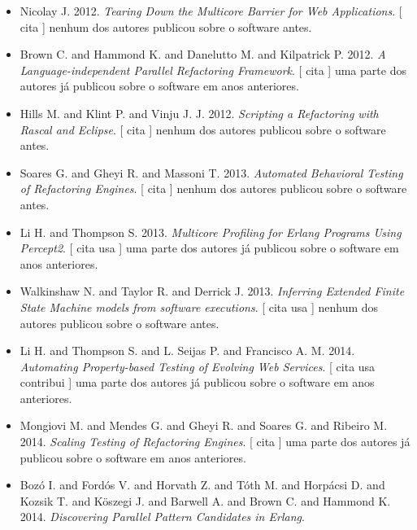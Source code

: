 \begin{itemize}
      [
          cita
          usa
          contribui
      ]
uma parte dos autores já publicou sobre o software em anos anteriores.
\item Nicolay J.
      2012.
        \textit{ Tearing Down the Multicore Barrier for Web Applications}.
      [
          cita
      ]
nenhum dos autores publicou sobre o software antes.
\item Brown C. and Hammond K. and Danelutto M. and Kilpatrick P.
      2012.
        \textit{ A Language-independent Parallel Refactoring Framework}.
      [
          cita
      ]
uma parte dos autores já publicou sobre o software em anos anteriores.
\item Hills M. and Klint P. and Vinju J. J.
      2012.
        \textit{ Scripting a Refactoring with Rascal and Eclipse}.
      [
          cita
      ]
nenhum dos autores publicou sobre o software antes.
\item Soares G. and Gheyi R. and Massoni T.
      2013.
        \textit{ Automated Behavioral Testing of Refactoring Engines}.
      [
          cita
      ]
nenhum dos autores publicou sobre o software antes.
\item Li H. and Thompson S.
      2013.
        \textit{ Multicore Profiling for Erlang Programs Using Percept2}.
      [
          cita
          usa
      ]
uma parte dos autores já publicou sobre o software em anos anteriores.
\item Walkinshaw N. and Taylor R. and Derrick J.
      2013.
        \textit{ Inferring Extended Finite State Machine models from software executions}.
      [
          cita
          usa
      ]
nenhum dos autores publicou sobre o software antes.
\item Li H. and Thompson S. and L. Seijas P. and Francisco A. M.
      2014.
        \textit{ Automating Property-based Testing of Evolving Web Services}.
      [
          cita
          usa
          contribui
      ]
uma parte dos autores já publicou sobre o software em anos anteriores.
\item Mongiovi M. and Mendes G. and Gheyi R. and Soares G. and Ribeiro M.
      2014.
        \textit{ Scaling Testing of Refactoring Engines}.
      [
          cita
      ]
uma parte dos autores já publicou sobre o software em anos anteriores.
\item Boz\'{o} I. and Ford\'{o}s V. and Horvath Z. and T\'{o}th M. and Horp\'{a}csi D. and Kozsik T. and K\"{o}szegi J. and Barwell A. and Brown C. and Hammond K.
      2014.
        \textit{ Discovering Parallel Pattern Candidates in Erlang}.

\end{itemize}
